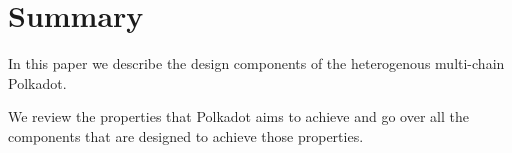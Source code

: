 \section{Summary}
In this paper we describe the design components of the heterogenous multi-chain Polkadot.

We review the properties that Polkadot aims to achieve and go over all the components that are designed to achieve those properties.
